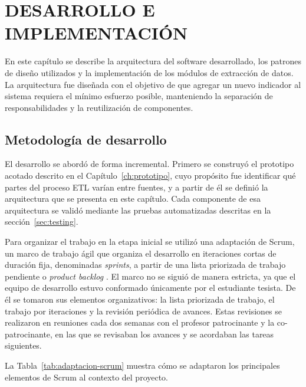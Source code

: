 \documentclass[12pt,letterpaper,oneside]{report}
\begin{document}
\chapter{DESARROLLO E IMPLEMENTACI\'ON}
\label{ch:desarrollo}

En este cap\'itulo se describe la arquitectura del software desarrollado, los patrones de dise\~no utilizados y la implementaci\'on de los m\'odulos de extracci\'on de datos. La arquitectura fue dise\~nada con el objetivo de que agregar un nuevo indicador al sistema requiera el m\'inimo esfuerzo posible, manteniendo la separaci\'on de responsabilidades y la reutilizaci\'on de componentes.

\section{Metodolog\'ia de desarrollo}
\label{sec:metodologia-desarrollo}

El desarrollo se abord\'o de forma incremental. Primero se construy\'o el prototipo acotado descrito en el Cap\'itulo~\ref{ch:prototipo}, cuyo prop\'osito fue identificar qu\'e partes del proceso ETL var\'ian entre fuentes, y a partir de \'el se defini\'o la arquitectura que se presenta en este cap\'itulo. Cada componente de esa arquitectura se valid\'o mediante las pruebas automatizadas descritas en la secci\'on~\ref{sec:testing}.

Para organizar el trabajo en la etapa inicial se utiliz\'o una adaptaci\'on de Scrum, un marco de trabajo \'agil que organiza el desarrollo en iteraciones cortas de duraci\'on fija, denominadas \textit{sprints}, a partir de una lista priorizada de trabajo pendiente o \textit{product backlog} \parencite{scrumguide2020}. El marco no se sigui\'o de manera estricta, ya que el equipo de desarrollo estuvo conformado \'unicamente por el estudiante tesista. De \'el se tomaron sus elementos organizativos: la lista priorizada de trabajo, el trabajo por iteraciones y la revisi\'on peri\'odica de avances. Estas revisiones se realizaron en reuniones cada dos semanas con el profesor patrocinante y la co-patrocinante, en las que se revisaban los avances y se acordaban las tareas siguientes.

La Tabla~\ref{tab:adaptacion-scrum} muestra c\'omo se adaptaron los principales elementos de Scrum al contexto del proyecto.
\end{document}
